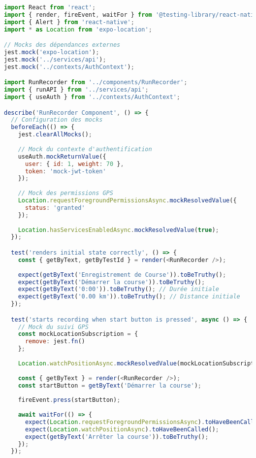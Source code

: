 \begin{lstlisting}[language=javascript, caption=Tests React Native avec Jest et React Native Testing Library]
import React from 'react';
import { render, fireEvent, waitFor } from '@testing-library/react-native';
import { Alert } from 'react-native';
import * as Location from 'expo-location';

// Mocks des dépendances externes
jest.mock('expo-location');
jest.mock('../services/api');
jest.mock('../contexts/AuthContext');

import RunRecorder from '../components/RunRecorder';
import { runAPI } from '../services/api';
import { useAuth } from '../contexts/AuthContext';

describe('RunRecorder Component', () => {
  // Configuration des mocks
  beforeEach(() => {
    jest.clearAllMocks();
    
    // Mock du contexte d'authentification
    useAuth.mockReturnValue({
      user: { id: 1, weight: 70 },
      token: 'mock-jwt-token'
    });
    
    // Mock des permissions GPS
    Location.requestForegroundPermissionsAsync.mockResolvedValue({
      status: 'granted'
    });
    
    Location.hasServicesEnabledAsync.mockResolvedValue(true);
  });

  test('renders initial state correctly', () => {
    const { getByText, getByTestId } = render(<RunRecorder />);
    
    expect(getByText('Enregistrement de Course')).toBeTruthy();
    expect(getByText('Démarrer la course')).toBeTruthy();
    expect(getByText('0:00')).toBeTruthy(); // Durée initiale
    expect(getByText('0.00 km')).toBeTruthy(); // Distance initiale
  });

  test('starts recording when start button is pressed', async () => {
    // Mock du suivi GPS
    const mockLocationSubscription = {
      remove: jest.fn()
    };
    
    Location.watchPositionAsync.mockResolvedValue(mockLocationSubscription);
    
    const { getByText } = render(<RunRecorder />);
    const startButton = getByText('Démarrer la course');
    
    fireEvent.press(startButton);
    
    await waitFor(() => {
      expect(Location.requestForegroundPermissionsAsync).toHaveBeenCalled();
      expect(Location.watchPositionAsync).toHaveBeenCalled();
      expect(getByText('Arrêter la course')).toBeTruthy();
    });
  });


\end{lstlisting}
